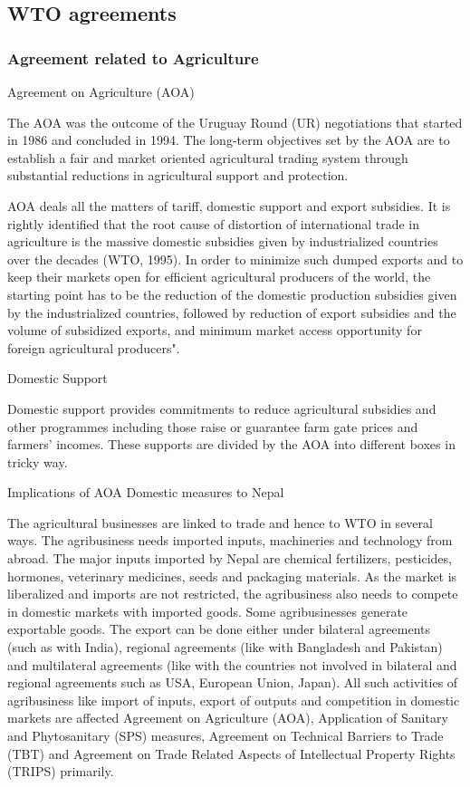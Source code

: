 \documentclass[
  openany]{book}
\begin{document}
\hypertarget{wto-agreements}{%
\subsection{WTO agreements}\label{wto-agreements}}

\hypertarget{agreement-related-to-agriculture}{%
\subsubsection{Agreement related to Agriculture}\label{agreement-related-to-agriculture}}

Agreement on Agriculture (AOA)

The AOA was the outcome of the Uruguay Round (UR) negotiations that started in 1986 and concluded in 1994. The long-term objectives set by the AOA are to establish a fair and market oriented agricultural trading system through substantial reductions in agricultural support and protection.

AOA deals all the matters of tariff, domestic support and export subsidies. It is rightly identified that the root cause of distortion of international trade in agriculture is the massive domestic subsidies given by industrialized countries over the decades (WTO, 1995). In order to minimize such dumped exports and to keep their markets open for efficient agricultural producers of the world, the starting point has to be the reduction of the domestic production subsidies given by the industrialized countries, followed by reduction of export subsidies and the volume of subsidized exports, and minimum market access opportunity for foreign agricultural producers".

Domestic Support

Domestic support provides commitments to reduce agricultural subsidies and other programmes including those raise or guarantee farm gate prices and farmers' incomes. These supports are divided by the AOA into different boxes in tricky way.

Implications of AOA Domestic measures to Nepal

The agricultural businesses are linked to trade and hence to WTO in several ways. The agribusiness needs imported inputs, machineries and technology from abroad. The major inputs imported by Nepal are chemical fertilizers, pesticides, hormones, veterinary medicines, seeds and packaging materials. As the market is liberalized and imports are not restricted, the agribusiness also needs to compete in domestic markets with imported goods. Some agribusinesses generate exportable goods. The export can be done either under bilateral agreements (such as with India), regional agreements (like with Bangladesh and Pakistan) and multilateral agreements (like with the countries not involved in bilateral and regional agreements such as USA, European Union, Japan). All such activities of agribusiness like import of inputs, export of outputs and competition in domestic markets are affected Agreement on Agriculture (AOA), Application of Sanitary and Phytosanitary (SPS) measures, Agreement on Technical Barriers to Trade (TBT) and Agreement on Trade Related Aspects of Intellectual Property Rights (TRIPS) primarily.
\end{document}
